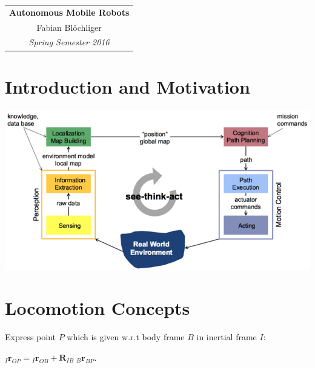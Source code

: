 \documentclass[landscape]{article}
\newcommand{\vmspace}{\vspace{-7pt}}
\newcommand{\vtspace}{\vspace{-10pt}}
\begin{document}
\pagestyle{empty}
\raggedright
\setlength{\columnsep}{2mm}
\setlength{\columnseprule}{0.1mm}
\renewcommand{\labelitemi}{--}

\begin{multicols}{3}


\begin{tabular}{|c|}\hline
  \LARGE \textbf{Autonomous Mobile Robots}\\[6pt]
  \large Fabian Bl\"ochliger\\[6pt]
  \large \textit{Spring Semester 2016}\\\hline
\end{tabular}

\vtspace

\section{Introduction and Motivation}

\vmspace

\includegraphics[width=\columnwidth]{img/1_SeeThinkAct.png}

\vspace{-12pt}

\section{Locomotion Concepts}

\vmspace

\begin{minipage}{\columnwidth}
  Express point $P$ which is given w.r.t body frame $B$ in inertial frame $I$:
  \vmspace
  \vmspace
  \begin{center}
  ${}_I\mathbf{r}_{OP} = {}_I\mathbf{r}_{OB} +
  \mathbf{R}_{IB}\;{}_B\mathbf{r}_{BP}$.
  \end{center}
\end{minipage}


\end{multicols}
\end{document}
